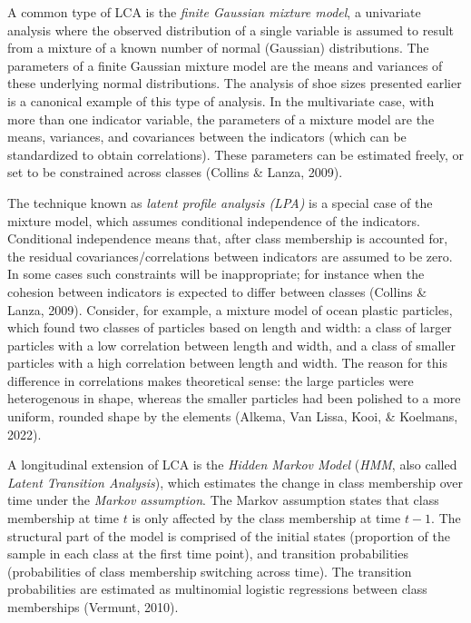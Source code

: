 \documentclass[
  ,man,floatsintext]{apa6}
\begin{document}
A common type of LCA is the \emph{finite Gaussian mixture model}, a
univariate analysis where the observed distribution of a single variable
is assumed to result from a mixture of a known number of normal
(Gaussian) distributions. The parameters of a finite Gaussian mixture
model are the means and variances of these underlying normal
distributions. The analysis of shoe sizes presented earlier is a
canonical example of this type of analysis. In the multivariate case,
with more than one indicator variable, the parameters of a mixture model
are the means, variances, and covariances between the indicators (which
can be standardized to obtain correlations). These parameters can be estimated
freely, or set to be constrained across classes (Collins \& Lanza, 2009).

The technique known as \emph{latent profile analysis (LPA)} is a special case
of the mixture model, which assumes conditional independence of the
indicators. Conditional independence means that, after class membership
is accounted for,
the residual covariances/correlations between indicators are
assumed to be zero.
In some cases such constraints
will be inappropriate; for instance when the cohesion between indicators
is expected to differ between classes (Collins \& Lanza, 2009).
Consider, for example, a mixture model of ocean plastic particles, which found two classes of particles based on length and width:
a class of larger particles with a low correlation between length and width,
and a class of smaller particles with a high correlation between length and width.
The reason for this difference in correlations makes theoretical sense:
the large particles were heterogenous in shape,
whereas the smaller particles had been polished to a more uniform, rounded shape by the elements (Alkema, Van Lissa, Kooi, \& Koelmans, 2022).

A longitudinal extension of LCA is the \emph{Hidden Markov Model} (\emph{HMM}, also
called \emph{Latent Transition Analysis}), which estimates the change in class
membership over time under the \emph{Markov assumption}. The Markov
assumption states that class membership at time \(t\) is only affected
by the class membership at time \(t-1\). The structural part of the model
is comprised of the initial states (proportion of the sample in each
class at the first time point), and transition probabilities
(probabilities of class membership switching across time). The transition
probabilities are estimated as multinomial logistic regressions between
class memberships (Vermunt, 2010).
\end{document}
